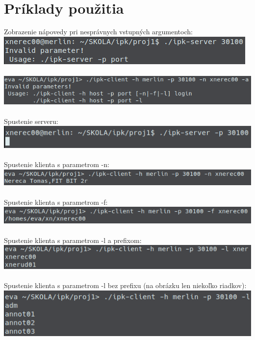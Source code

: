 \documentclass[a4paper, 11pt]{article}
\begin{document}
\section{Príklady použitia}
Zobrazenie nápovedy pri nesprávnych vstupných argumentoch:\\
\includegraphics[scale=0.5]{1.png}\\\\
\includegraphics[scale=0.5]{3.png}\\\\
Spustenie serveru:\\
\includegraphics[scale=0.5]{2.png}\\\\
Spustenie klienta s parametrom -n:\\
\includegraphics[scale=0.5]{4.png}\\\\
Spustenie klienta s parametrom -f:\\
\includegraphics[scale=0.5]{5.png}\\\\
Spustenie klienta s parametrom -l a prefixom:\\
\includegraphics[scale=0.5]{6.png}\\\\
Spustenie klienta s parametrom -l bez prefixu (na obrázku len niekoľko riadkov):\\
\includegraphics[scale=0.5]{7.png}
\end{document}
